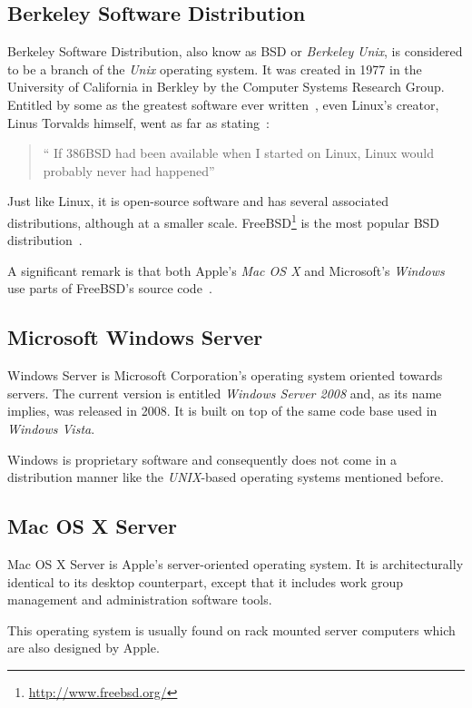 \subsection{Berkeley Software Distribution}
Berkeley Software Distribution, also know as BSD or \textit{Berkeley} \textit{Unix}, is considered to be a branch of the \textit{Unix} operating system. It was created in 1977 in the University of California in Berkley by the Computer Systems Research Group.  Entitled by some as the greatest software ever written~\cite{ greatest_software_ever_written}, even Linux's creator, Linus Torvalds himself, went as far as stating~\cite{ interview_linus}: 
\begin{quote}
  `` If 386BSD had been available when I started on Linux, Linux would probably never had happened''
\end{quote}
Just like Linux, it is open-source software and has several associated distributions, although at a smaller scale. FreeBSD\footnote{\url{http://www.freebsd.org/}} is the most popular BSD distribution~\cite{top_5_bsd_distros}.

A significant remark is that both Apple's \textit{Mac OS X} and Microsoft's \textit{Windows} use parts of FreeBSD's source code~\cite{leopard_os_foundations,bsd_code_windows}.

\subsection{Microsoft Windows Server}
Windows Server is Microsoft Corporation's operating system oriented towards servers. The current version is entitled \textit{Windows Server 2008} and, as its name implies, was released in 2008. It is built on top of the same code base used in \textit{Windows Vista}.

Windows is proprietary software and consequently does not come in a distribution manner like the \textit{UNIX}-based operating systems mentioned before.

\subsection{Mac OS X Server}
Mac OS X Server is Apple's server-oriented operating system. It is architecturally identical to its desktop counterpart, except that it includes work group management and administration software tools.

This operating system is usually found on rack mounted server computers which are also designed by Apple.

